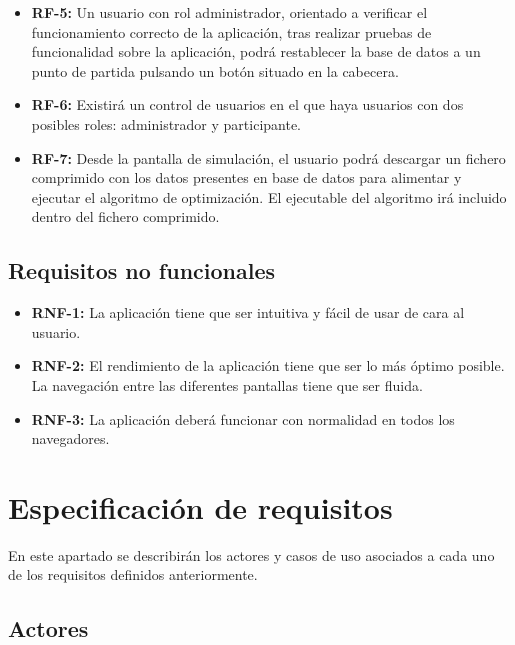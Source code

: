 \begin{itemize}
	\item \textbf{RF-5:} Un usuario con rol administrador, orientado a verificar el funcionamiento correcto de la aplicación,  tras realizar pruebas de funcionalidad sobre la aplicación, podrá restablecer la base de datos a un punto de partida pulsando un botón situado en la cabecera.
	
	\item \textbf{RF-6:} Existirá un control de usuarios en el que haya usuarios con dos posibles roles: administrador y participante.
	
	\item \textbf{RF-7:} Desde la pantalla de simulación, el usuario podrá descargar un fichero comprimido con los datos presentes en base de datos para alimentar y ejecutar el algoritmo de optimización. El ejecutable del algoritmo irá incluido dentro del fichero comprimido.
\end{itemize}

\subsection{Requisitos no funcionales}

	\begin{itemize}
	
		\item \textbf{RNF-1:} La aplicación tiene que ser intuitiva y fácil de usar de cara al usuario.
		\item \textbf{RNF-2:} El rendimiento de la aplicación tiene que ser lo más óptimo posible. La navegación entre las diferentes pantallas tiene que ser fluida. 
		\item \textbf{RNF-3:} La aplicación deberá funcionar con normalidad en todos los navegadores.
		
	\end{itemize}
	
\newpage

\section{Especificación de requisitos}

En este apartado se describirán los actores y casos de uso asociados a cada uno de los requisitos definidos anteriormente. 

\subsection{Actores}


